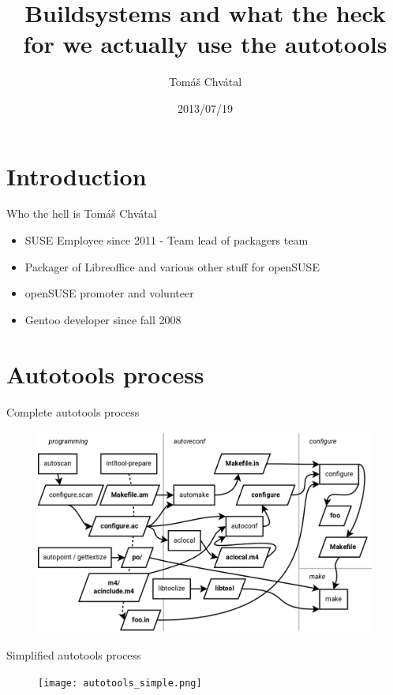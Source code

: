 \documentclass{beamer}
\author{Tom\'{a}\v{s} Chv\'{a}tal\newline {\small SUSE Packagers team}}
\title{Buildsystems and what the heck for we actually use the autotools}
\date{2013/07/19}
\begin{document}
\begin{frame}[t,plain]
\titlepage
\end{frame}

\section{Introduction}

\begin{frame}[t]{Who the hell is Tomáš Chvátal}
	\begin{itemize}
	\item SUSE Employee since 2011 - Team lead of packagers team
	\item Packager of Libreoffice and various other stuff for openSUSE
	\item openSUSE promoter and volunteer
	\item Gentoo developer since fall 2008
	\end{itemize}
\end{frame}

\section{Autotools process}

\begin{frame}{Complete autotools process}
	\begin{figure}
	\includegraphics[width= 1.0\linewidth]{autotools.png}
	\end{figure}
\end{frame}

\begin{frame}{Simplified autotools process}
	\begin{figure}
	\texttt{[image: autotools\_simple.png]}
	\end{figure}
\end{frame}
\end{document}
